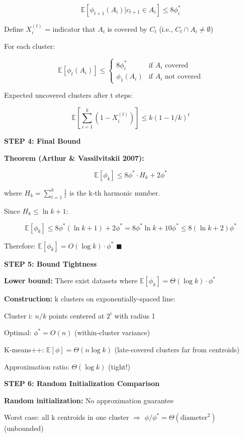 \documentclass[12pt]{article}
\begin{document}
\begin{solution}
\[
\mathbb{E}[\phi_{t+1}(A_i) | c_{t+1} \in A_i] \leq 8\phi_i^*
\]

Define $X_i^{(t)}$ = indicator that $A_i$ is covered by $C_t$ (i.e., $C_t \cap A_i \neq \emptyset$)

For each cluster:

\[
\mathbb{E}[\phi_t(A_i)] \leq
\begin{cases}
8\phi_i^* & \text{if } A_i \text{ covered} \\
\phi_1(A_i) & \text{if } A_i \text{ not covered}
\end{cases}
\]

Expected uncovered clusters after t steps:

\[
\mathbb{E}\left[\sum_{i=1}^k (1 - X_i^{(t)})\right] \leq k(1 - 1/k)^t
\]

\textbf{STEP 4: Final Bound}

\textbf{Theorem (Arthur \& Vassilvitskii 2007):}

\[
\mathbb{E}[\phi_k] \leq 8\phi^* \cdot H_k + 2\phi^*
\]

where $H_k = \sum_{t=1}^k \frac{1}{t}$ is the k-th harmonic number.

Since $H_k \leq \ln k + 1$:

\[
\mathbb{E}[\phi_k] \leq 8\phi^*(\ln k + 1) + 2\phi^* = 8\phi^* \ln k + 10\phi^* \leq 8(\ln k + 2)\phi^*
\]

Therefore: $\mathbb{E}[\phi_k] = O(\log k) \cdot \phi^*$ \quad $\blacksquare$

\textbf{STEP 5: Bound Tightness}

\textbf{Lower bound:} There exist datasets where $\mathbb{E}[\phi_k] = \Theta(\log k) \cdot \phi^*$

\textbf{Construction:} k clusters on exponentially-spaced line:

Cluster i: $n/k$ points centered at $2^i$ with radius 1

Optimal: $\phi^* = O(n)$ (within-cluster variance)

K-means++: $\mathbb{E}[\phi] = \Theta(n \log k)$ (late-covered clusters far from centroids)

Approximation ratio: $\Theta(\log k)$ (tight!)

\textbf{STEP 6: Random Initialization Comparison}

\textbf{Random initialization:} No approximation guarantee

Worst case: all k centroids in one cluster $\Rightarrow$ $\phi/\phi^* = \Theta(\text{diameter}^2)$ (unbounded)


\end{solution}
\end{document}
